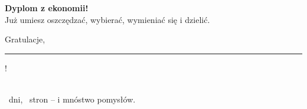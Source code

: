 \begin{center}
\vspace*{3cm}

\medalla{\totaldias}

\vspace{8mm}
{\fontsize{34}{40}\selectfont\bfseries\color{colorLectura} Dyplom z ekonomii!}\\[8mm]
{\Large Już umiesz oszczędzać, wybierać, wymieniać się i dzielić.}\\[10mm]
{\Large Gratulacje, \rule{65mm}{0.4pt}!}\\[14mm]
{\large \totaldias\ dni, \totaldias\ stron -- i mnóstwo pomysłów.}
\end{center}
\vspace*{\fill}
\newpage
